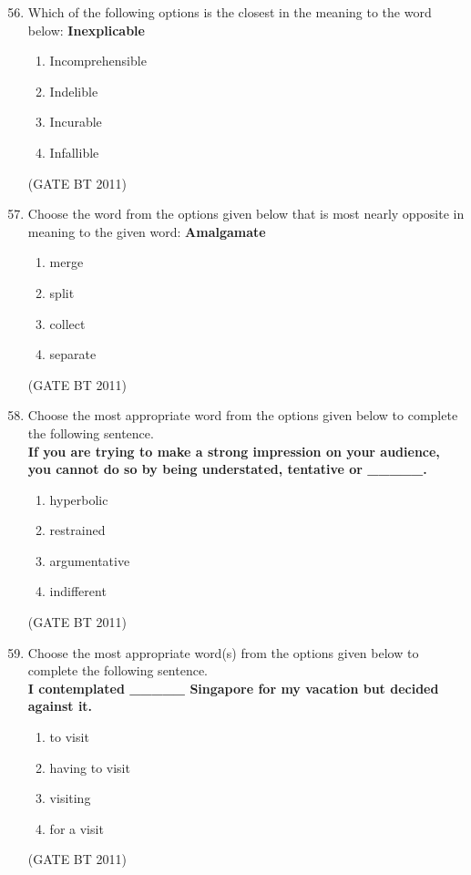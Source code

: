 \documentclass[journal,12pt,onecolumn]{IEEEtran}
\begin{document}
\begin{enumerate}
\setcounter{enumi}{55}

  \item Which of the following options is the closest in the meaning to the word below: \textbf{Inexplicable}

    \begin{enumerate}
      \item Incomprehensible
      \item Indelible
      \item Incurable
      \item Infallible
    \end{enumerate}
     \hfill(GATE BT 2011)


  \item Choose the word from the options given below that is most nearly opposite in meaning to the given word: \textbf{Amalgamate}

    \begin{enumerate}
      \item merge
      \item split
      \item collect
      \item separate
    \end{enumerate}
     \hfill(GATE BT 2011)

  \item Choose the most appropriate word from the options given below to complete the following sentence. \\
  \textbf{If you are trying to make a strong impression on your audience, you cannot do so by being understated, tentative or \_\_\_\_\_.}

    \begin{enumerate}
      \item hyperbolic
      \item restrained
      \item argumentative
      \item indifferent
    \end{enumerate}
     \hfill(GATE BT 2011)

  \item Choose the most appropriate word(s) from the options given below to complete the following sentence. \\
  \textbf{I contemplated \_\_\_\_\_ Singapore for my vacation but decided against it.}

    \begin{enumerate}
      \item to visit
      \item having to visit
      \item visiting
      \item for a visit
    \end{enumerate}
     \hfill(GATE BT 2011)



\end{enumerate}
\end{document}
